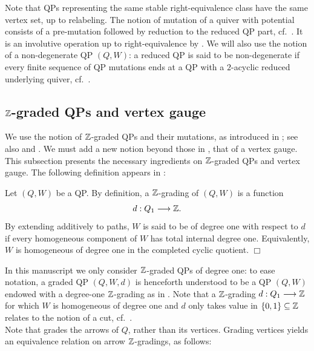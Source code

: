 \noindent Note that QPs representing the same stable right-equivalence class have the same vertex set, up to relabeling. The notion of mutation of a quiver with potential consists of a pre-mutation followed by reduction to the reduced QP part, cf.~\cite[Section 5]{DWZ}. It is an involutive operation up to right-equivalence by \cite[Theorem~5.7]{DWZ}. We will also use the notion of a non-degenerate QP $(Q,W)$: a reduced QP is said to be non-degenerate if every finite sequence of QP mutations ends at a QP with a $2$-acyclic reduced underlying quiver, cf.~\cite[Section 7]{DWZ}.

\subsection{$\mathbb Z$-graded QPs and vertex gauge}

We use the notion of $\mathbb Z$-graded QPs and their mutations, as introduced in \cite[Section 6]{AO}; see also \cite{Keller2026_GradedPreprint} and \cite{HerschendIyama2010}. We must add a new notion beyond those in \cite{AO}, that of a vertex gauge. This subsection presents the necessary ingredients on $\mathbb Z$-graded QPs and vertex gauge. The following definition appears in \cite[Section 6.3]{AO}:

\begin{definition}\label{def:degree-one-grading}
Let $(Q,W)$ be a QP. By definition, a $\mathbb Z$-grading of $(Q,W)$ is a function
\[
 d:Q_1\longrightarrow\mathbb Z.
\]
By extending additively to paths, $W$ is said to be of degree one with respect to $d$ if every homogeneous component of \(W\) has total internal degree
one. Equivalently, \(W\) is homogeneous of degree one in the completed
cyclic quotient.
\hfill$\Box$\end{definition}
\noindent In this manuscript we only consider $\mathbb Z$-graded QPs of degree one: to ease notation, a graded QP $(Q,W,d)$ is henceforth understood to be a QP $(Q,W)$ endowed with a degree-one $\mathbb Z$-grading as in . Note that a $\mathbb Z$-grading $d:Q_1\longrightarrow\mathbb Z$ for which $W$ is homogeneous of degree one and $d$ only takes value in $\{0,1\}\subseteq\mathbb Z$ relates to the notion of a cut, cf.~\cite[Definition 3.1]{HerschendIyama2010}.\\

Note that  grades the arrows of $Q$, rather than its vertices. Grading vertices yields an equivalence relation on arrow $\mathbb Z$-gradings, as follows:

